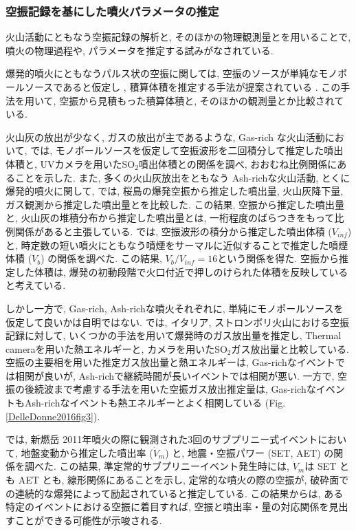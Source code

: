 \documentclass[12pt]{article}
\begin{document}
\clearpage
\subsubsection{空振記録を基にした噴火パラメータの推定}\label{AcointPara}

火山活動にともなう空振記録の解析と, そのほかの物理観測量とを用いることで, 噴火の物理過程や, パラメータを推定する試みがなされている. 

爆発的噴火にともなうパルス状の空振に関しては, 空振のソースが単純なモノポールソースであると仮定し \citep{Lighthill1978}, 積算体積を推定する手法が提案されている \citep{Johnson2003}. この手法を用いて, 空振から見積もった積算体積と, そのほかの観測量とか比較されている.

火山灰の放出が少なく, ガスの放出が主であるような, Gas-rich な火山活動において, \cite{Dalton2010}では, モノポールソースを仮定して空振波形を二回積分して推定した噴出体積と, UVカメラを用いたSO$_2$噴出体積との関係を調べ, おおむね比例関係にあることを示した.
また, 多くの火山灰放出をともなう Ash-richな火山活動, とくに爆発的噴火に関して, \cite{Fee2017a}では, 桜島の爆発空振から推定した噴出量, 火山灰降下量, ガス観測から推定した噴出量とを比較した. この結果, 空振から推定した噴出量と, 火山灰の堆積分布から推定した噴出量とは, 一桁程度のばらつきをもって比例関係があると主張している.
\cite{Yamada2018b}では, 空振波形の積分から推定した噴出体積 ($V_{inf}$)と, 時定数の短い噴火にともなう噴煙をサーマルに近似することで推定した噴煙体積 ($V_{b}$) の関係を調べた. この結果, $V_{b}/V_{inf}=16$という関係を得た. 空振から推定した体積は, 爆発の初動段階で火口付近で押しのけられた体積を反映していると考えている. 

しかし一方で, Gas-rich, Ash-richな噴火それぞれに, 単純にモノポールソースを仮定して良いかは自明ではない. \cite{DelleDonne2016} では, イタリア, ストロンボリ火山における空振記録に対して, いくつかの手法を用いて爆発時のガス放出量を推定し, Thermal cameraを用いた熱エネルギーと, カメラを用いたSO$_2$ガス放出量と比較している. 
空振の主要相を用いた推定ガス放出量と熱エネルギーは, Gas-richなイベントでは相関が良いが, Ash-richで継続時間が長いイベントでは相関が悪い. 一方で, 空振の後続波まで考慮する手法を用いた空振ガス放出推定量は, Gas-richなイベントもAsh-richなイベントも熱エネルギーとよく相関している (Fig. \ref{DelleDonne2016fig3}). 


\cite{Ichihara2016a}では, 新燃岳 2011年噴火の際に観測された3回のサブプリニー式イベントにおいて, 地盤変動から推定した噴出率 ($\dot{V}_m$) と, 地震・空振パワー (SET, AET) の関係を調べた. この結果, 準定常的サブプリニーイベント発生時には, $\dot{V}_m$は SET とも AET とも, 線形関係にあることを示し, 定常的な噴火の際の空振が, 破砕面での連続的な爆発によって励起されていると推定している. この結果からは, ある特定のイベントにおける空振に着目すれば, 空振と噴出率・量の対応関係を見出すことができる可能性が示唆される.
\end{document}
